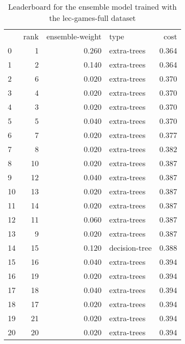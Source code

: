 \begin{table}[]
	\centering
	\begin{tabular}{lrrlr}
		   & rank & ensemble-weight & type          & cost  \\
		0  & 1    & 0.260           & extra-trees   & 0.364 \\
		1  & 2    & 0.140           & extra-trees   & 0.364 \\
		2  & 6    & 0.020           & extra-trees   & 0.370 \\
		3  & 4    & 0.020           & extra-trees   & 0.370 \\
		4  & 3    & 0.020           & extra-trees   & 0.370 \\
		5  & 5    & 0.040           & extra-trees   & 0.370 \\
		6  & 7    & 0.020           & extra-trees   & 0.377 \\
		7  & 8    & 0.020           & extra-trees   & 0.382 \\
		8  & 10   & 0.020           & extra-trees   & 0.387 \\
		9  & 12   & 0.040           & extra-trees   & 0.387 \\
		10 & 13   & 0.020           & extra-trees   & 0.387 \\
		11 & 14   & 0.020           & extra-trees   & 0.387 \\
		12 & 11   & 0.060           & extra-trees   & 0.387 \\
		13 & 9    & 0.020           & extra-trees   & 0.387 \\
		14 & 15   & 0.120           & decision-tree & 0.388 \\
		15 & 16   & 0.040           & extra-trees   & 0.394 \\
		16 & 19   & 0.020           & extra-trees   & 0.394 \\
		17 & 18   & 0.040           & extra-trees   & 0.394 \\
		18 & 17   & 0.020           & extra-trees   & 0.394 \\
		19 & 21   & 0.020           & extra-trees   & 0.394 \\
		20 & 20   & 0.020           & extra-trees   & 0.394 \\
	\end{tabular}

	\caption{Leaderboard for the ensemble model trained with the lec-games-full dataset}
	\label{tab:lb-lec-games-full}
\end{table}

